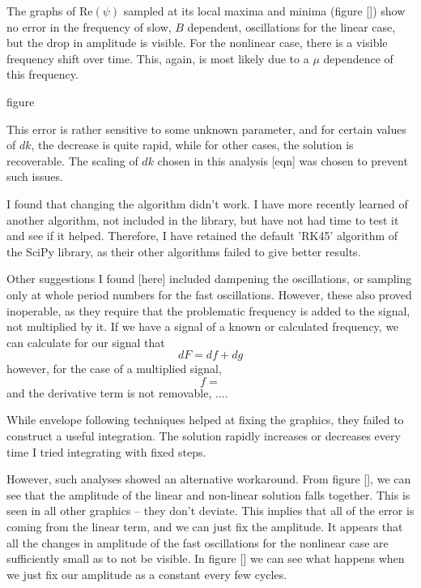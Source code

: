 \documentclass[A4,12pt,oneside]{article}
\renewcommand{\(}{\left(}
\renewcommand{\)}{\right)}
\renewcommand{\Re}{\mathrm{Re}}
\begin{document}
The graphs of $\Re\left(\psi\right)$ sampled at its local maxima and minima (figure []) show no error in the frequency of slow, $B$ dependent, oscillations for the linear case, but the drop in amplitude is visible. For the nonlinear case, there is a visible frequency shift over time. This, again, is most likely due to a $\mu$ dependence of this frequency.

figure

This error is rather sensitive to some unknown parameter, and for certain values of $dk$, the decrease is quite rapid, while for other cases, the solution is recoverable. The scaling of $dk$ chosen in this analysis [eqn] was chosen to prevent such issues.

I found that changing the algorithm didn't work. I have more recently learned of another algorithm, not included in the library, but have not had time to test it and see if it helped. Therefore, I have retained the default 'RK45' algorithm of the SciPy library, as their other algorithms failed to give better results.

Other suggestions I found [here] included dampening the oscillations, or sampling only at whole period numbers for the fast oscillations. However, these also proved inoperable, as they require that the problematic frequency is added to the signal, not multiplied by it. If we have a signal of a known or calculated frequency, we can calculate for our signal that 
\begin{equation}
dF = df + dg
\end{equation}
however, for the case of a multiplied signal, 
\begin{equation}
f = 
\end{equation}
and the derivative term is not removable, .... 

While envelope following techniques helped at fixing the graphics, they failed to construct a useful integration. The solution rapidly increases or decreases every time I tried integrating with fixed steps.

However, such analyses showed an alternative workaround. From figure [], we can see that the amplitude of the linear and non-linear solution falls together. This is seen in all other graphics -- they don't deviate. This implies that all of the error is coming from the linear term, and we can just fix the amplitude. It appears that all the changes in amplitude of the fast oscillations for the nonlinear case are sufficiently small as to not be visible. In figure [] we can see what happens when we just fix our amplitude as a constant every few cycles. 
\end{document}
